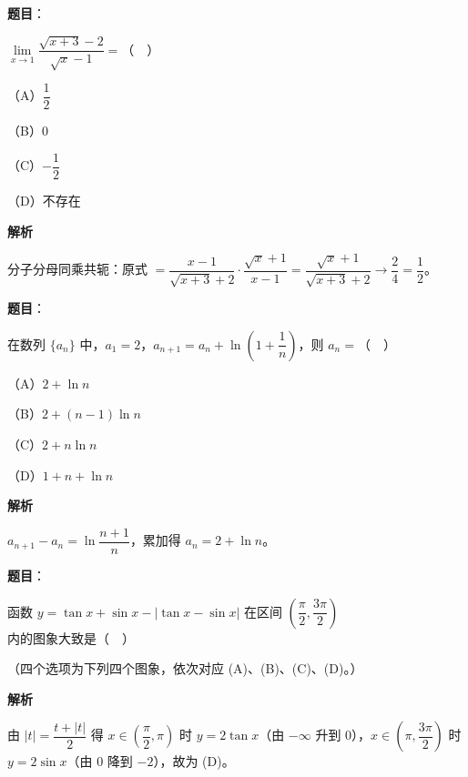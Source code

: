 \begin{answer}

\textbf{题目}：

$\lim\limits_{x\to1}\dfrac{\sqrt{x+3}-2}{\sqrt x-1}=$（　）

（A）$\dfrac12$

（B）$0$

（C）$-\dfrac12$

（D）不存在

\textbf{解析}

分子分母同乘共轭：原式 $=\dfrac{x-1}{\sqrt{x+3}+2}\cdot\dfrac{\sqrt x+1}{x-1}=\dfrac{\sqrt x+1}{\sqrt{x+3}+2}\to\dfrac{2}{4}=\dfrac12$。


\end{answer}
\begin{answer}

\textbf{题目}：

在数列 $\{a_n\}$ 中，$a_1=2$，$a_{n+1}=a_n+\ln\left(1+\dfrac1n\right)$，则 $a_n=$（　）

（A）$2+\ln n$

（B）$2+(n-1)\ln n$

（C）$2+n\ln n$

（D）$1+n+\ln n$

\textbf{解析}

$a_{n+1}-a_n=\ln\dfrac{n+1}n$，累加得 $a_n=2+\ln n$。


\end{answer}
\begin{answer}

\textbf{题目}：

函数 $y=\tan x+\sin x-|\tan x-\sin x|$ 在区间 $\left(\dfrac{\pi}2,\dfrac{3\pi}2\right)$ 内的图象大致是（　）

（四个选项为下列四个图象，依次对应 (A)、(B)、(C)、(D)。）
\nopagebreak[4]
\begin{center}\end{center}
\nopagebreak[4]
\textbf{解析}

由 $|t|=\dfrac{t+|t|}2$ 得 $x\in\left(\dfrac\pi2,\pi\right)$ 时 $y=2\tan x$（由 $-\infty$ 升到 $0$），$x\in\left(\pi,\dfrac{3\pi}2\right)$ 时 $y=2\sin x$（由 $0$ 降到 $-2$），故为 (D)。


\end{answer}
